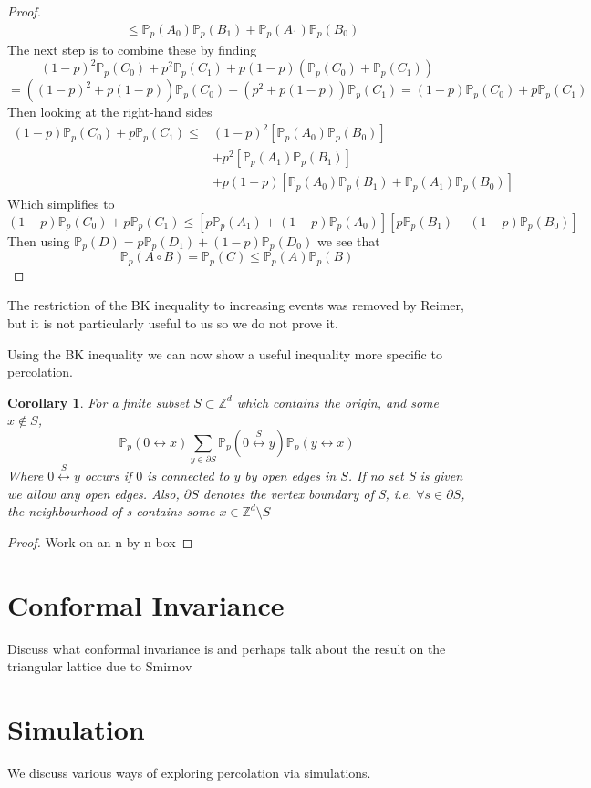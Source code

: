 \documentclass[a4paper,11pt]{article}
\newtheorem{corollary}[theorem]{Corollary}
\theoremstyle{definition}
\newcommand{\ints}{\mathbb{Z}}
\newcommand{\prob}{\mathbb{P}_p}
\begin{document}
\begin{proof}
\begin{align*}
								&\leq \prob(A_0)\prob(B_1) + \prob(A_1)\prob(B_0)
	\end{align*}
	The next step is to combine these by finding 
	$$(1-p)^2\prob(C_0) + p^2\prob(C_1) + p(1-p)(\prob(C_0) + \prob(C_1))$$
	$$=((1-p)^2 + p(1-p))\prob(C_0) + (p^2 + p(1-p))\prob(C_1) = (1-p)\prob(C_0) + p\prob(C_1)$$
	Then looking at the right-hand sides
	\begin{align*}
		(1-p)\prob(C_0) + p\prob(C_1) \leq& (1-p)^2[\prob(A_0)\prob(B_0)]\\
		&+ p^2[\prob(A_1)\prob(B_1)]\\
		& +p(1-p)[\prob(A_0)\prob(B_1) + \prob(A_1)\prob(B_0)]
	\end{align*}
	Which simplifies to 
	$$(1-p)\prob(C_0) + p\prob(C_1) \leq [p\prob(A_1) + (1-p)\prob(A_0)][p\prob(B_1) + (1-p)\prob(B_0)]$$
	Then using $\prob(D) = p\prob(D_1) + (1-p)\prob(D_0)$ we see that
	$$\prob(A \circ B) = \prob(C) \leq \prob(A)\prob(B)$$

\end{proof}
The restriction of the BK inequality to increasing events was removed by Reimer, but it is not particularly useful to us so we do not prove it.

Using the BK inequality we can now show a useful inequality more specific to percolation.
\begin{corollary}
	For a finite subset $S \subset \ints^d$ which contains the origin, and some $x \notin S$, 
	$$\prob(0 \longleftrightarrow x) \sum_{y\in \partial S} \prob({0\stackrel{S}{\longleftrightarrow}y})\prob(y \longleftrightarrow x)$$
	Where $0\stackrel{S}{\longleftrightarrow}y$ occurs if $0$ is connected to $y$ by open edges in $S$. If no set S is given we allow any open edges.
	Also, $\partial S$ denotes the vertex boundary of S, i.e. $\forall s \in \partial S$, the neighbourhood of s contains some $x \in \ints^d \setminus S$
\end{corollary}
\begin{proof}
	{\color{red}{todo}}
	Work on an n by n box
\end{proof}



\section{Conformal Invariance}
Discuss what conformal invariance is and perhaps talk about the result on the triangular lattice due to Smirnov

\section{Simulation}
We discuss various ways of exploring percolation via simulations.
\end{document}
